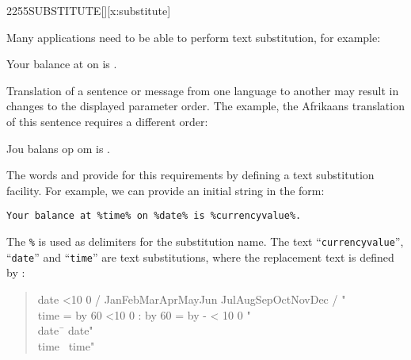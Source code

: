 \begin{worddef}{2255}{SUBSTITUTE}[][x:substitute]
	\begin{rationale}
		Many applications need to be able to perform text substitution, for
		example:

		\begin{center}
			 Your balance at  on  is .
		\end{center}

		Translation of a sentence or message from one language to another may
		result in changes to the displayed parameter order.  The example, the
		Afrikaans translation of this sentence requires a different order:

		\begin{center}
			Jou balans op  om  is .
		\end{center}

		The words  and  provide for this
		requirements by defining a text substitution facility.  For example,
		we can provide an initial string in the form:

		\begin{center}
			\texttt{Your balance at \%time\% on \%date\% is \%currencyvalue\%.}
		\end{center}

		The \texttt{\%} is used as delimiters for the substitution name.  The
		text ``\texttt{currencyvalue}'', ``\texttt{date}'' and ``\texttt{time}''
		are text substitutions, where the replacement text is defined by
		:

\makeatletter
\newcommand{\ptime}{%
	\@tempcnta = \time
	\divide\@tempcnta by 60
	\ifnum\@tempcnta<10 0\fi%
	\number\@tempcnta%
	:%
	\multiply\@tempcnta by 60
	\@tempcntb = \time
	\advance\@tempcntb by -\@tempcnta
	\ifnum\@tempcntb < 10 0\fi%
	\number\@tempcntb
}

\newcommand{\pdate}{%
	\ifnum\day<10 0\fi%
	\number\day%
	/%
	\ifcase\month
	\or Jan\or Feb\or Mar\or Apr\or May\or Jun
	\or Jul\or Aug\or Sep\or Oct\or Nov\or Dec\fi%
	/%
	\number\year
}
\makeatother

		\begin{quote}\ttfamily
			\begin{tabbing}
				\word{:} date  \pdate" \word{;} \\
				\word{:} time  \ptime" \word{;} \\
				date\ \=  date" \word{REPLACES} \\ \>  time" 
			\end{tabbing}
		\end{quote}


\end{rationale}
\end{worddef}
